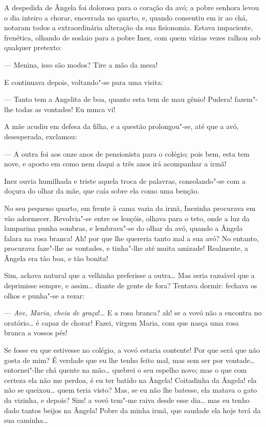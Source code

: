 A despedida de Ângela foi dolorosa para o coração da avó; a pobre
senhora levou o dia inteiro a chorar, encerrada no quarto, e, quando
consentiu em ir ao chá, notaram todos a extraordinária alteração da sua
fisionomia. Estava impaciente, frenética, olhando de soslaio para a
pobre Inez, com quem várias vezes ralhou sob qualquer pretexto:

--- Menina, isso são modos? Tire a mão da mesa!

E continuava depois, voltando"-se para uma visita:

--- Tanto tem a Angelita de boa, quanto esta tem de mau gênio! Pudera!
fazem"-lhe todas as vontades! Eu nunca vi!

A mãe acudiu em defesa da filha, e a questão prolongou"-se, até que a
avó, desesperada, exclamou:

--- A outra foi aos onze anos de pensionista para o colégio; pois bem,
esta tem nove, e aposto em como nem daqui a três anos irá acompanhar a
irmã!

Inez ouvia humilhada e triste aquela troca de palavras, consolando"-se
com a doçura do olhar da mãe, que caía sobre ela como uma benção.

No seu pequeno quarto, em frente à cama vazia da irmã, Inezinha
procurava em vão adormecer. Revolvia"-se entre os lençóis, olhava para o
teto, onde a luz da lamparina punha sombras, e lembrava"-se do olhar da
avó, quando a Ângela falara na rosa branca! Ah! por que lhe quereria
tanto mal a sua avó? No entanto, procurava faze"-lhe as vontades, e
tinha"-lhe até muita amizade! Realmente, a Ângela era tão boa, e tão
bonita!

Sim, achava natural que a velhinha preferisse a outra\ldots{} Mas seria
razoável que a deprimisse sempre, e assim\ldots{} diante de gente de fora?
Tentava dormir: fechava os olhos e punha"-se a rezar:

--- \emph{Ave, Maria, cheia de graça}!\ldots{} E a rosa branca? ah! se a vovó
não a encontra no oratório\ldots{} é capaz de chorar! Fazei, virgem Maria,
com que nasça uma rosa branca a vossos pés!

Se fosse eu que estivesse no colégio, a vovó estaria contente! Por que
será que não gosta de mim? É verdade que eu lhe tenho feito mal, mas sem
ser por vontade\ldots{} entornei"-lhe chá quente na mão\ldots{} quebrei o seu
espelho novo; mas o que com certeza ela não me perdoa, é eu ter batido
na Ângela! Coitadinha da Ângela! ela não se queixou\ldots{} quem teria visto?
Mas, se eu não lhe batesse, ela matava o gato da vizinha, e depois? Sim!
a vovó tem"-me raiva desde esse dia\ldots{} mas eu tenho dado tantos beijos na
Ângela! Pobre da minha irmã, que saudade ela hoje terá da sua caminha\ldots{}

